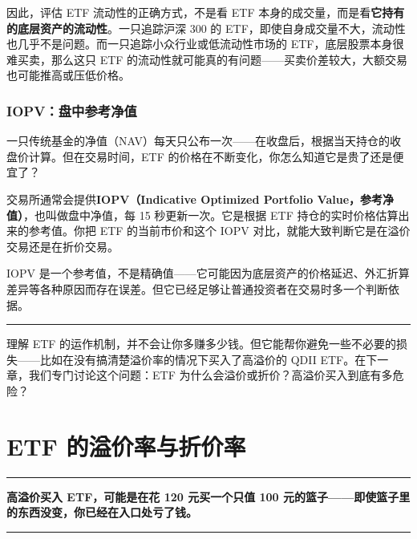 \documentclass[a4paper,11pt,oneside,fontset=none,UTF8,zihao=-4]{ctexbook}
\begin{document}
因此，评估 ETF 流动性的正确方式，不是看 ETF
本身的成交量，而是看\textbf{它持有的底层资产的流动性}。一只追踪沪深 300
的
ETF，即使自身成交量不大，流动性也几乎不是问题。而一只追踪小众行业或低流动性市场的
ETF，底层股票本身很难买卖，那么这只 ETF
的流动性就可能真的有问题------买卖价差较大，大额交易也可能推高或压低价格。

\subsection{IOPV：盘中参考净值}\label{iopvux76d8ux4e2dux53c2ux8003ux51c0ux503c}

一只传统基金的净值（NAV）每天只公布一次------在收盘后，根据当天持仓的收盘价计算。但在交易时间，ETF
的价格在不断变化，你怎么知道它是贵了还是便宜了？

交易所通常会提供\textbf{IOPV（Indicative Optimized Portfolio
Value，参考净值）}，也叫做盘中净值，每 15 秒更新一次。它是根据 ETF
持仓的实时价格估算出来的参考值。你把 ETF 的当前市价和这个 IOPV
对比，就能大致判断它是在溢价交易还是在折价交易。

IOPV
是一个参考值，不是精确值------它可能因为底层资产的价格延迟、外汇折算差异等各种原因而存在误差。但它已经足够让普通投资者在交易时多一个判断依据。

\begin{center}{\color{dh-bronze}\rule{0.2\textwidth}{0.5pt}}\end{center}

理解 ETF
的运作机制，并不会让你多赚多少钱。但它能帮你避免一些不必要的损失------比如在没有搞清楚溢价率的情况下买入了高溢价的
QDII ETF。在下一章，我们专门讨论这个问题：ETF
为什么会溢价或折价？高溢价买入到底有多危险？

\newpage

\chapter{ETF
的溢价率与折价率}\label{etf-ux7684ux6ea2ux4ef7ux7387ux4e0eux6298ux4ef7ux7387}

\begin{center}{\color{dh-bronze}\rule{0.2\textwidth}{0.5pt}}\end{center}

\begin{dhquote}
\textbf{高溢价买入 ETF，可能是在花 120 元买一个只值 100
元的篮子------即使篮子里的东西没变，你已经在入口处亏了钱。}
\end{dhquote}

\begin{center}{\color{dh-bronze}\rule{0.2\textwidth}{0.5pt}}\end{center}
\end{document}
